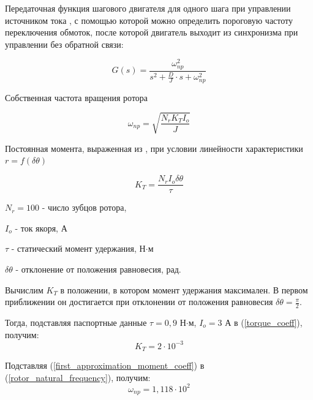 Передаточная функция шагового двигателя для одного шага при управлении источником тока \cite[гл. 4.2, ф-ла 4.65]{Kenio}, с помощью которой можно определить пороговую частоту переключения обмоток, после которой двигатель выходит из синхронизма при управлении без обратной связи:

\begin{equation}
    \label{step_motor_transfer_function}
    G(s) = \frac{ \omega_{np}^{2} }
                { s^{2} + \frac{D}{J} \cdot s + \omega_{np}^{2} }
\end{equation}

Собственная частота вращения ротора \cite[гл. 4.2, ф-ла 4.48]{Kenio}

\begin{equation}
    \label{rotor_natural_frequency}
    \omega_{np} = \sqrt{\frac{N_{r}K_{T}I_{o}}{J}}
\end{equation}

Постоянная момента, выраженная из \cite[гл. 4.2, ф-ла 4.52]{Kenio}, при условии линейности характеристики $r = f(\delta\theta)$

\begin{equation}
    \label{torque_coeff}
    K_{T} = \frac{N_{r}I_{o}\delta\theta}{\tau}
\end{equation}

$N_{r} = 100$ - число зубцов ротора,

$I_{o}$ - ток якоря, А

$\tau$ - статический момент удержания, Н$\cdot$м

$\delta\theta$ - отклонение от положения равновесия, рад.
\newline
\newline

Вычислим $K_{T}$ в положении, в котором момент удержания максимален.
В первом приближении он достигается при отклонении от положения равновесия
$\delta\theta = \frac{\pi}{2}$.

Тогда, подставляя паспортные данные $\tau = 0,9$ Н$\cdot$м, $I_{o} = 3$
А в (\ref{torque_coeff}), получим:
\begin{equation}
    \label{first_approximation_moment_coeff}
    K_{T} = 2\cdot10^{-3}
\end{equation}

Подставляя (\ref{first_approximation_moment_coeff}) в (\ref{rotor_natural_frequency}), получим:
\begin{equation}
    \label{first_approximation_rotor_natural_frequency}
    \omega_{np} = 1,118 \cdot 10^{2}
\end{equation}

